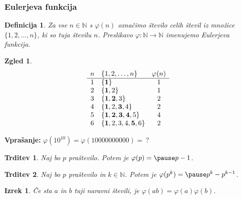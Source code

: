 \documentclass{beamer}
\def\N{\mathbb{N}} %
\newtheorem{izrek}{Izrek}
\newtheorem{trditev}{Trditev}
\newtheorem{definicija}{Definicija}
\newtheorem{zgled}{Zgled}
\begin{document}

\begin{frame}
\frametitle{Eulerjeva funkcija}

\pause
\begin{definicija}
Za vse $n \in \N$ s \alert{$\varphi(n)$} označimo število 
celih števil iz množice $\{1, 2, \ldots, n\}$, ki so tuja številu $n$.
Preslikavo \alert{$\varphi: \N \rightarrow \N$} imenujemo \alert{Eulerjeva funkcija}.
\end{definicija}
\pause

\vfill
\begin{zgled}
\[
\begin{array}{clc}
 n & \{1, 2, \ldots, n\}          & \varphi(n)       \\
 \hline
 1 & \{\bf{1}\}                    &     1      \\
 2 & \{{\bf 1},2 \}               &     1      \\
 3 & \{{\bf 1,2},3 \}             &     2      \\
 4 & \{{\bf 1},2,{\bf 3},4 \}     &     2      \\
 5 & \{{\bf 1,2,3,4},5 \}         &     4      \\
 6 & \{{\bf 1},2,3,4,{\bf 5},6 \} &     2
\end{array}
\]
\end{zgled}

\end{frame}



\begin{frame}

{\bf Vprašanje:} \quad $\varphi(10^{10}) = \varphi(10000000000) =\ ?$
\pause

\bigskip
\begin{trditev}
Naj bo $p$ praštevilo. Potem je $\varphi(p) = \pause p-1$.
\end{trditev}
\pause

\bigskip
\begin{trditev}
Naj bo $p$ praštevilo in $k \in \N$. Potem je $\varphi(p^k) = \pause p^k-p^{k-1}$.
\end{trditev}
\pause

\bigskip
\begin{izrek}
Če sta $a$ in $b$ tuji naravni števili, je
$\varphi(a b) = \varphi(a)\varphi(b)$.
\end{izrek}


\end{frame}
\end{document}
